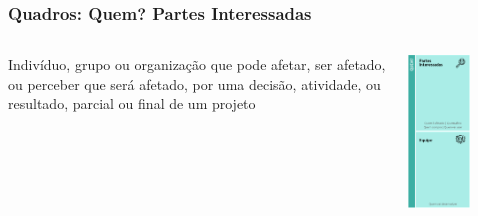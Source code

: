 \documentclass[aspectratio=169]{beamer}
\begin{document}
\begin{frame}
\frametitle{Quadros: Quem? Partes Interessadas}
\begin{columns}
    \begin{column}{.66\textwidth}
        Indivíduo, grupo ou organização que pode afetar, ser afetado, ou perceber que será afetado, por uma decisão, atividade, ou resultado, parcial ou final de um projeto
    \end{column}
    \begin{column}{.33\textwidth}
            \centering
    \includegraphics[width=0.6\textwidth]{detalhes/quem.png}
    \end{column}
\end{columns}

    
\end{frame}
\end{document}
